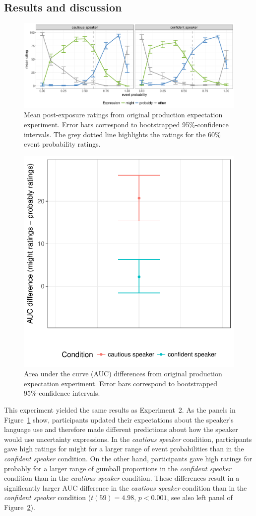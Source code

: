 \documentclass[man, floatsintext]{apa6}
\begin{document}
\subsection{Results and discussion}

\begin{figure}
\includegraphics[width=\textwidth]{plots/exp-1-ratings.pdf}
\caption{Mean post-exposure ratings from original production expectation experiment. Error bars correspond to bootstrapped 95\%-confidence intervals.  The grey dotted line highlights the ratings for the 60\% event probability ratings.  \label{fig:adaptation-results-prod-orig}}
\end{figure}

\begin{figure}
\center
\includegraphics[width=.4\textwidth]{plots/exp-1-auc-orig.pdf}
\caption{Area under the curve (AUC) differences from original production expectation experiment. Error bars correspond to bootstrapped 95\%-confidence intervals.  \label{fig:adaptation-auc-prod-orig}}
\end{figure}

This experiment yielded the same results as Experiment~2. As the panels in Figure~\ref{fig:adaptation-results-prod-orig} show, participants updated their expectations about the speaker's language use and therefore made different predictions about how the speaker would use uncertainty expressions. In the \emph{cautious speaker} condition, participants gave high ratings for {\sc might} for a larger range of event probabilities than in the \emph{confident speaker} condition. On the other hand, participants gave high ratings for {\sc probably} for a larger range of gumball proportions in the \emph{confident speaker} condition than in the \emph{cautious speaker} condition. These differences result in a significantly larger AUC difference in the \emph{cautious speaker} condition than in the \emph{confident speaker} condition ($t(59) = 4.98$, $p < 0.001$, see also left panel of Figure~\ref{fig:adaptation-auc-prod-orig}).
\end{document}
